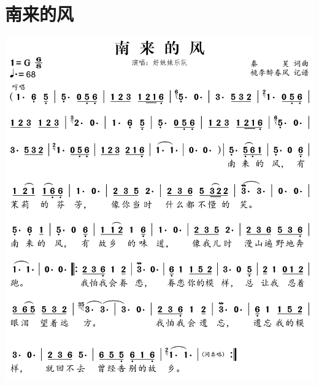 \documentclass[cn,pad,chinesefont=nofont]{elegantbook}
\begin{document}
\section{南来的风}
    \includegraphics[width=\textwidth]{dongxiao/20200516-好妹妹-南来的风.jpg} 
\end{document}
